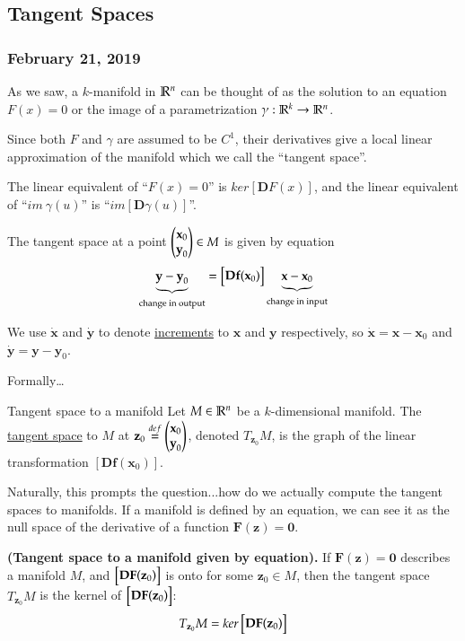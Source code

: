 \subsection{Tangent Spaces}
\subsubsection*{February 21, 2019}


As we saw, a $k$-manifold in $\mathbb{R}^n$ can be thought of as the solution to an equation $F(x)=0$ or the image of a parametrization $\gamma : \mathbb{R}^k \to \mathbb{R}^{n}$.

Since both $F$ and $\gamma$ are assumed to be $C^1$, their derivatives give a local linear approximation of the manifold which we call the ``tangent space''.

The linear equivalent of ``$F(x)=0$'' is $ker[\bm{D}F(x)]$, and the linear equivalent of ``$im\ \gamma(u)$'' is ``$im[\bm{D}\gamma(u)]$''.

The tangent space at a point $\begin{pmatrix} \textbf{x}_0 \\ \textbf{y}_0 \end{pmatrix}\in M$ is given by equation
\begin{equation}
	\underbrace{\textbf{y}-\textbf{y}_0}_{\text{change in output}} = \begin{bmatrix} \textbf{Df}(\textbf{x}_0) \end{bmatrix}\underbrace{\textbf{x}-\textbf{x}_0}_{\text{change in input}}
\end{equation}

We use $\dot{\bm{x}}$ and $\dot{\bm{y}}$ to denote \ul{increments} to $\bm{x}$ and $\bm{y}$ respectively, so $\dot{\bm{x}} = \bm{x}-\bm{x}_0$ and $\dot{\bm{y}} = \bm{y}-\bm{y}_0$. 

Formally\dots 
\begin{defn}{Tangent space to a manifold}
	Let $M\in \mathbb{R}^n$ be a $k$-dimensional manifold. The \ul{tangent space} to $M$ at $\textbf{z}_0\overset{def}{=}\begin{pmatrix} \textbf{x}_0 \\ \textbf{y}_0 \end{pmatrix}$, denoted $T_{\bm{z}_0}M$, is the graph of the linear transformation $[\bm{Df}(\bm{x}_0)]$. 
\end{defn}

Naturally, this prompts the question...how do we actually compute the tangent spaces to manifolds. If a manifold is defined by an equation, we can see it as the null space of the derivative of a function $\bm{F}(\bm{z}) = \bm{0}$. 
\begin{theorem}
	\textbf{(Tangent space to a manifold given by equation).} If $\bm{F}(\bm{z}) = \bm{0}$ describes a manifold $M$, and $\begin{bmatrix} \textbf{DF}(\textbf{z}_0) \end{bmatrix}$ is onto for some $\bm{z}_0\in M$, then the tangent space $T_{\bm{z}_0}M$ is the kernel of $\begin{bmatrix} \textbf{DF}(\textbf{z}_0) \end{bmatrix}$:
	\begin{equation}
		T_{\textbf{z}_0}M = ker \begin{bmatrix} \textbf{DF}(\textbf{z}_0) \end{bmatrix}
	\end{equation}
\end{theorem}


